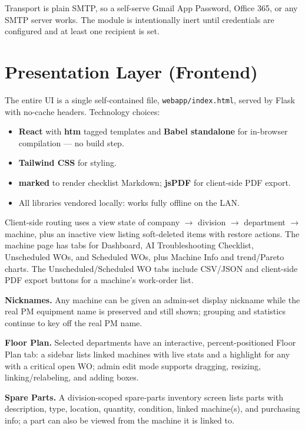 \documentclass[11pt,a4paper]{article}
\newcommand{\code}[1]{\texttt{#1}}
\begin{document}
Transport is plain SMTP, so a self-serve Gmail App Password, Office 365, or
any SMTP server works. The module is intentionally inert until credentials
are configured and at least one recipient is set.

\section{Presentation Layer (Frontend)}

The entire UI is a single self-contained file, \code{webapp/index.html},
served by Flask with no-cache headers. Technology choices:
\begin{itemize}
    \item \textbf{React} with \textbf{htm} tagged templates and
          \textbf{Babel standalone} for in-browser compilation --- no build
          step.
    \item \textbf{Tailwind CSS} for styling.
    \item \textbf{marked} to render checklist Markdown; \textbf{jsPDF} for
          client-side PDF export.
    \item All libraries vendored locally: works fully offline on the LAN.
\end{itemize}

Client-side routing uses a view state of company $\rightarrow$ division
$\rightarrow$ department $\rightarrow$ machine, plus an inactive view
listing soft-deleted items with restore actions. The machine page has tabs
for Dashboard, AI Troubleshooting Checklist, Unscheduled WOs, and Scheduled
WOs, plus Machine Info and trend/Pareto charts. The Unscheduled/Scheduled WO
tabs include CSV/JSON and client-side PDF export buttons for a machine's
work-order list.

\textbf{Nicknames.} Any machine can be given an admin-set display nickname
while the real PM equipment name is preserved and still shown; grouping and
statistics continue to key off the real PM name.

\textbf{Floor Plan.} Selected departments have an interactive,
percent-positioned Floor Plan tab: a sidebar lists linked machines with live
stats and a highlight for any with a critical open WO; admin edit mode
supports dragging, resizing, linking/relabeling, and adding boxes.

\textbf{Spare Parts.} A division-scoped spare-parts inventory screen lists
parts with description, type, location, quantity, condition, linked
machine(s), and purchasing info; a part can also be viewed from the machine
it is linked to.
\end{document}
